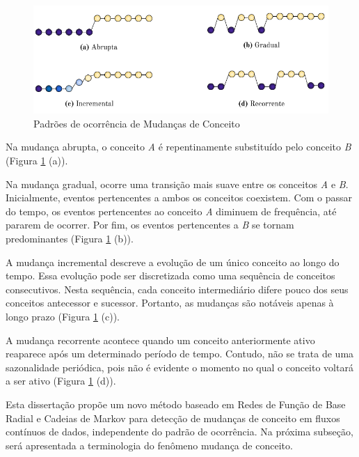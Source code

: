 \documentclass[msc, classic, a4paper]{ufbathesis}
\begin{document}
\begin{figure}[H]
\begin{center}
    \includegraphics[scale=0.8]{imagens/concept_drift_patterns.png}
    \caption{Padrões de ocorrência de Mudanças de Conceito}
    \label{fig:concept_drift_patterns}
\end{center}
\end{figure}

Na mudança abrupta, o conceito \textit{A} é repentinamente substituído pelo conceito \textit{B} (Figura \ref{fig:concept_drift_patterns} (a)).

Na mudança gradual, ocorre uma transição mais suave entre os conceitos \textit{A} e \textit{B}.
Inicialmente, eventos pertencentes a ambos os conceitos coexistem.
Com o passar do tempo, os eventos pertencentes ao conceito \textit{A} diminuem de frequência, até pararem de ocorrer.
Por fim, os eventos pertencentes a \textit{B} se tornam predominantes (Figura \ref{fig:concept_drift_patterns} (b)).

A mudança incremental descreve a evolução de um único conceito ao longo do tempo.
Essa evolução pode ser discretizada como uma sequência de conceitos consecutivos.
Nesta sequência, cada conceito intermediário difere pouco dos seus conceitos antecessor e sucessor.
Portanto, as mudanças são notáveis apenas à longo prazo (Figura \ref{fig:concept_drift_patterns} (c)).

A mudança recorrente acontece quando um conceito anteriormente ativo reaparece após um determinado período de tempo.
Contudo, não se trata de uma sazonalidade periódica, pois não é evidente o momento no qual o conceito voltará a ser ativo (Figura \ref{fig:concept_drift_patterns} (d)).

Esta dissertação propõe um novo método baseado em Redes de Função de Base Radial e Cadeias de Markov para detecção de mudanças de conceito em fluxos contínuos de dados, independente do padrão de ocorrência.
Na próxima subseção, será apresentada a terminologia do fenômeno mudança de conceito.
\end{document}
